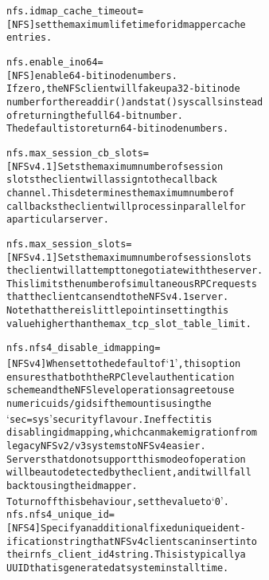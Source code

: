 \documentclass[a4paper,8pt,english]{sphinxmanual}
\begin{document}
\begin{alltt}
        nfs.idmap\_cache\_timeout=
                        {[}NFS{]} set the maximum lifetime for idmapper cache
                        entries.

        nfs.enable\_ino64=
                        {[}NFS{]} enable 64-bit inode numbers.
                        If zero, the NFS client will fake up a 32-bit inode
                        number for the readdir() and stat() syscalls instead
                        of returning the full 64-bit number.
                        The default is to return 64-bit inode numbers.

        nfs.max\_session\_cb\_slots=
                        {[}NFSv4.1{]} Sets the maximum number of session
                        slots the client will assign to the callback
                        channel. This determines the maximum number of
                        callbacks the client will process in parallel for
                        a particular server.

        nfs.max\_session\_slots=
                        {[}NFSv4.1{]} Sets the maximum number of session slots
                        the client will attempt to negotiate with the server.
                        This limits the number of simultaneous RPC requests
                        that the client can send to the NFSv4.1 server.
                        Note that there is little point in setting this
                        value higher than the max\_tcp\_slot\_table\_limit.

        nfs.nfs4\_disable\_idmapping=
                        {[}NFSv4{]} When set to the default of `1', this option
                        ensures that both the RPC level authentication
                        scheme and the NFS level operations agree to use
                        numeric uids/gids if the mount is using the
                        `sec=sys' security flavour. In effect it is
                        disabling idmapping, which can make migration from
                        legacy NFSv2/v3 systems to NFSv4 easier.
                        Servers that do not support this mode of operation
                        will be autodetected by the client, and it will fall
                        back to using the idmapper.
                        To turn off this behaviour, set the value to `0'.
        nfs.nfs4\_unique\_id=
                        {[}NFS4{]} Specify an additional fixed unique ident-
                        ification string that NFSv4 clients can insert into
                        their nfs\_client\_id4 string.  This is typically a
                        UUID that is generated at system install time.


\end{alltt}
\end{document}
